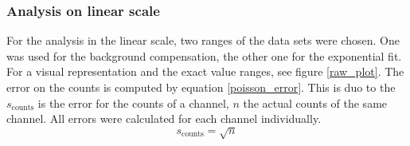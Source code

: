 \documentclass[30pt,a4paper]{article}
\begin{document}
 	\subsubsection{Analysis on linear scale}
 	For the analysis in the linear scale, two ranges of the data sets were chosen.
 	One	was used for the background compensation, the other one for the exponential fit.
 	For a visual representation and the exact value ranges, see figure \ref{raw_plot}.
 	The error on the counts is computed by
 	equation \ref{poisson_error}. This is duo to the  $s_{\text{counts}}$ is the error for the counts of a channel, $n$  the actual counts of the same channel. All errors were calculated for each channel individually.
 	\begin{equation}
 	s_{\text{counts}}=\sqrt{n}
 	\label{poisson_error}
 	\end{equation}
 	
\end{document}
